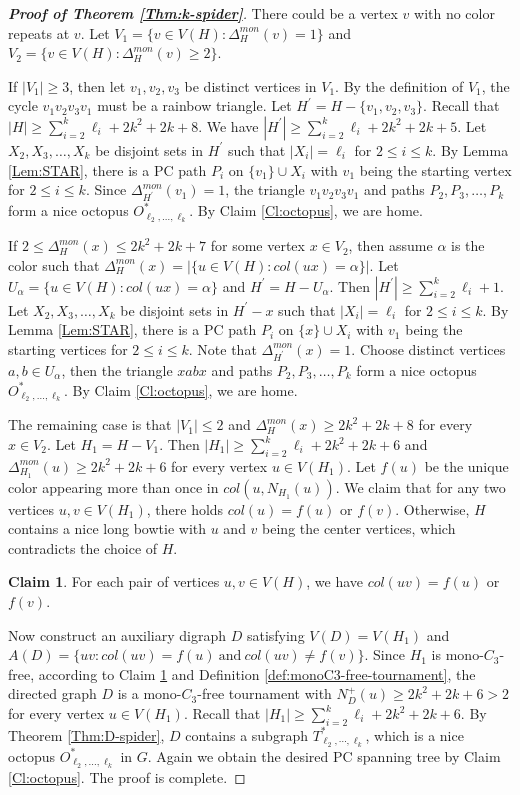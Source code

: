 \documentclass[10pt,a4paper]{article}
\theoremstyle{definition}
\newtheorem{claimA}[lemmaA]{Claim}
\begin{document}
\begin{proof}[\textbf{Proof of Theorem \ref{Thm:k-spider}}]
There could be a vertex $v$ with no color repeats at $v$. Let $V_1=\{v\in V(H): \Delta^{mon}_H(v)=1\}$ and $V_2=\{v\in V(H): \Delta^{mon}_H(v)\geq 2\}$.

If $|V_1|\geq 3$, then let $v_1,v_2,v_3$ be distinct vertices in $V_1$. By the definition of $V_1$, the cycle $v_1v_2v_3v_1$ must be a rainbow triangle. Let $H^\prime=H-\{v_1,v_2,v_3\}$. Recall that $|H|\geq \sum_{i=2}^k\ell_i+2k^2+2k+8$. We have $|H^\prime|\geq \sum_{i=2}^k\ell_i+2k^2+2k+5$. Let $X_2, X_3,\ldots, X_k$ be disjoint sets in $H^\prime$ such that $|X_i|=\ell_i$ for $2\leq i\leq k$. By Lemma \ref{Lem:STAR}, there is a PC path $P_i$ on $\{v_1\}\cup X_i$ with $v_1$ being the starting vertex for $2\leq i\leq k$. Since $\Delta^{mon}_{H^\prime}(v_1)=1$, the triangle $v_1v_2v_3v_1$ and paths $P_2,P_3,\ldots,P_k$ form a nice octopus $O^*_{ \ell_2, \ldots, \ell_k}$. By Claim \ref{Cl:octopus}, we are home.

If $2\leq \Delta^{mon}_{H}(x)\leq 2k^2+2k+7$ for some vertex $x\in V_2$, then assume $\alpha$ is the color such that $\Delta^{mon}_{H}(x) = |\{u\in V(H): col(ux) = \alpha\}|$.  Let $U_\alpha=\{u\in V(H): col(ux) = \alpha\}$ and $H^\prime=H-U_\alpha$. Then $|H^\prime|\geq \sum_{i=2}^k\ell_i+1$. Let $X_2, X_3,\ldots, X_k$ be disjoint sets in $H^\prime-x$ such that $|X_i|=\ell_i$ for $2\leq i\leq k$. By Lemma \ref{Lem:STAR}, there is a PC path $P_i$ on $\{x\}\cup X_i$ with $v_1$ being the starting vertices for $2\leq i\leq k$. Note that $\Delta^{mon}_{H^\prime}(x)=1$. Choose distinct vertices $a,b\in U_\alpha$, then the triangle $xabx$ and paths $P_2,P_3,\ldots,P_k$ form a nice octopus $O^*_{ \ell_2, \ldots, \ell_k}$. By Claim \ref{Cl:octopus}, we are home.

The remaining case is that $|V_1|\leq 2$ and $\Delta^{mon}_{H}(x)\geq 2k^2+2k+8$ for every $x\in V_2$. Let $H_1=H-V_1$.
Then $|H_1|\geq \sum_{i=2}^k\ell_i+2k^2+2k+6$ and $\Delta^{mon}_{H_1}(u)\geq 2k^2+2k+6$ for every vertex $u\in V(H_1)$. Let $f(u)$ be the unique color appearing more than once in $col(u,N_{H_1}(u))$. We claim that for any two vertices $u, v\in V(H_1)$,  there holds $col(u)=f(u)$ or $f(v)$. Otherwise, $H$ contains a nice long bowtie with $u$ and $v$ being the center vertices, which contradicts the choice of $H$.
\begin{claimA}\label{Cl:degenerate}
For each pair of vertices $u,v\in V(H)$, we have $col(uv)=f(u)$ or $f(v)$.
\end{claimA}
Now construct an auxiliary digraph $D$ satisfying $V(D)=V(H_1)$ and $A(D)=\{uv: col(uv)=f(u) \ \text{and}\  col(uv)\ne f(v) \}.$ Since $H_1$ is mono-$C_3$-free, according to Claim \ref{Cl:degenerate} and Definition \ref{def:monoC3-free-tournament}, the directed graph $D$ is a mono-$C_3$-free tournament with $N^+_{D}(u)\geq 2k^2+2k+6>2$ for every vertex $u\in V(H_1)$. Recall that $|H_1|\geq \sum_{i=2}^k\ell_i+2k^2+2k+6$.
By Theorem \ref{Thm:D-spider}, $D$ contains a subgraph $ T^*_{\ell_2, \cdots, \ell_k}$, which is a nice octopus $O^*_{ \ell_2,\ldots,\ell_k}$ in $G$. Again we obtain the desired PC spanning tree by Claim \ref{Cl:octopus}. The proof is complete.
\end{proof}
\end{document}

